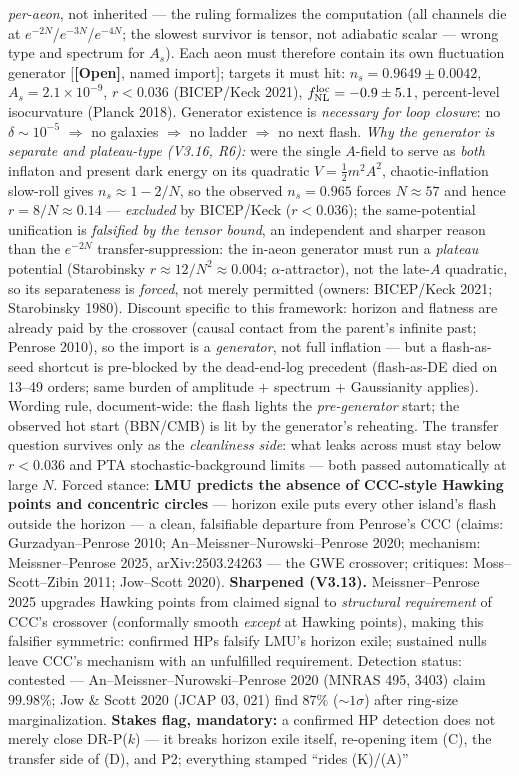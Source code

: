 \documentclass[11pt]{article}
\newcommand{\open}{\textcolor{red!70!black}{\textbf{[Open]}}}
\begin{document}
\emph{per-aeon}, not inherited --- the ruling formalizes the computation (all channels die at $e^{-2N}$/$e^{-3N}$/$e^{-4N}$; the slowest survivor is tensor, not adiabatic scalar --- wrong type and spectrum for $A_s$). Each aeon must therefore contain its own fluctuation generator [\open, named import]; targets it must hit: $n_s=0.9649\pm0.0042$, $A_s=2.1\times10^{-9}$, $r<0.036$ (BICEP/Keck 2021), $f_{\rm NL}^{\rm loc}=-0.9\pm5.1$, percent-level isocurvature (Planck 2018). Generator existence is \emph{necessary for loop closure}: no $\delta\sim10^{-5}$ $\Rightarrow$ no galaxies $\Rightarrow$ no ladder $\Rightarrow$ no next flash. \emph{Why the generator is separate \emph{and} plateau-type (V3.16, R6):} were the single $A$-field to serve as \emph{both} inflaton and present dark energy on its quadratic $V=\tfrac12 m^2A^2$, chaotic-inflation slow-roll gives $n_s\approx1-2/N$, so the observed $n_s=0.965$ forces $N\approx57$ and hence $r=8/N\approx0.14$ --- \emph{excluded} by BICEP/Keck ($r<0.036$); the same-potential unification is \emph{falsified by the tensor bound}, an independent and sharper reason than the $e^{-2N}$ transfer-suppression: the in-aeon generator must run a \emph{plateau} potential (Starobinsky $r\approx12/N^2\approx0.004$; $\alpha$-attractor), not the late-$A$ quadratic, so its separateness is \emph{forced}, not merely permitted (owners: BICEP/Keck 2021; Starobinsky 1980). Discount specific to this framework: horizon and flatness are already paid by the crossover (causal contact from the parent's infinite past; Penrose 2010), so the import is a \emph{generator}, not full inflation --- but a flash-as-seed shortcut is pre-blocked by the dead-end-log precedent (flash-as-DE died on 13--49 orders; same burden of amplitude $+$ spectrum $+$ Gaussianity applies). Wording rule, document-wide: the flash lights the \emph{pre-generator} start; the observed hot start (BBN/CMB) is lit by the generator's reheating. The transfer question survives only as the \emph{cleanliness side}: what leaks across must stay below $r<0.036$ and PTA stochastic-background limits --- both passed automatically at large $N$. Forced stance: \textbf{LMU predicts the absence of CCC-style Hawking points and concentric circles} --- horizon exile puts every other island's flash outside the horizon --- a clean, falsifiable departure from Penrose's CCC (claims: Gurzadyan--Penrose 2010; An--Meissner--Nurowski--Penrose 2020; mechanism: Meissner--Penrose 2025, arXiv:2503.24263 --- the GWE crossover; critiques: Moss--Scott--Zibin 2011; Jow--Scott 2020). \textbf{Sharpened (V3.13).} Meissner--Penrose 2025 upgrades Hawking points from claimed signal to \emph{structural requirement} of CCC's crossover (conformally smooth \emph{except} at Hawking points), making this falsifier symmetric: confirmed HPs falsify LMU's horizon exile; sustained nulls leave CCC's mechanism with an unfulfilled requirement. Detection status: contested --- An--Meissner--Nurowski--Penrose 2020 (MNRAS 495, 3403) claim $99.98\%$; Jow \& Scott 2020 (JCAP 03, 021) find $87\%$ ($\sim$$1\sigma$) after ring-size marginalization. \textbf{Stakes flag, mandatory:} a confirmed HP detection does not merely close DR-P($k$) --- it breaks horizon exile itself, re-opening item (C), the transfer side of (D), and P2; everything stamped ``rides (K)/(A)'' 
\end{document}
